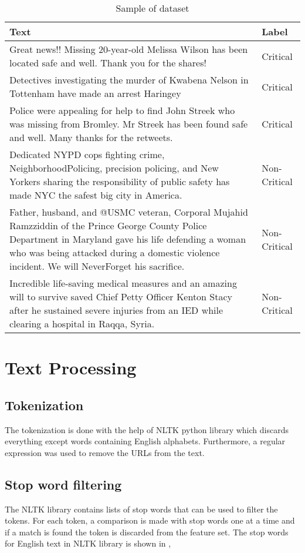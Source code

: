 \begin{table}
\begin{center}
\caption{Sample of dataset}
\label{tbl:dataset_sample}
\begin{tabular}{p{12cm}p{2cm}}
\toprule 
Text&Label\\
\midrule 
Great news!! Missing 20-year-old Melissa Wilson has been located safe and well. Thank you for the shares!&Critical\\
\hline
Detectives investigating the murder of Kwabena Nelson in Tottenham have made an arrest Haringey&Critical\\
\hline
Police were appealing for help to find John Streek who was missing from Bromley. Mr Streek has been found safe and well. Many thanks for the retweets.&Critical\\
\hline
Dedicated NYPD cops fighting crime, NeighborhoodPolicing, precision policing, and New Yorkers sharing the responsibility of public safety has made NYC the safest
big city in America.&Non-Critical\\
\hline
Father, husband, and @USMC veteran, Corporal Mujahid Ramzziddin of the Prince George County Police Department in Maryland gave his life defending a woman who was being attacked during a domestic violence incident. We will NeverForget his sacrifice. &Non-Critical\\
\hline
Incredible life-saving medical measures and an amazing will to survive saved Chief Petty Officer Kenton Stacy after he sustained severe injuries from an IED while clearing a hospital in Raqqa, Syria.&Non-Critical\\
\bottomrule
\end{tabular}
\end{center}
\end{table}

\section{Text Processing}
\subsection{Tokenization}
The tokenization is done with the help of NLTK\cite{loper2002nltk} python library which discards everything except words containing English alphabets. Furthermore, a regular expression was used to remove the URLs from the text.

\subsection{Stop word filtering}
The NLTK library contains lists of stop words that can be used to filter the tokens. For each token, a comparison is made with stop words one at a time and if a match is found the token is discarded from the feature set. The stop words for English text in NLTK library is shown in ,

